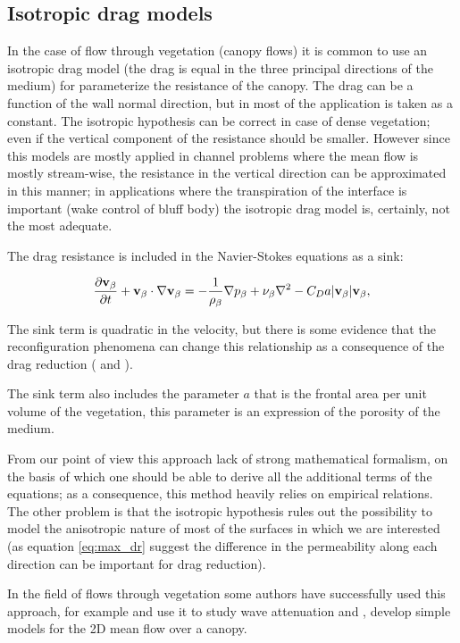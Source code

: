 \subsection{Isotropic drag models}
\label{sec:canopy_eq}

In the case of flow through vegetation (canopy flows) it is common to use an isotropic drag model (the drag is equal in the three principal directions of the medium) for parameterize the resistance of the canopy.
The drag can be a function of the wall normal direction, but in most of the application is taken as a constant.
The isotropic hypothesis can be correct in case of dense vegetation; even if the vertical component of the resistance should be smaller.
However since this models are mostly applied in channel problems where the mean flow is mostly stream-wise, the resistance in the vertical direction can be approximated in this manner; in applications where the transpiration of the interface is important (wake control of bluff body) the isotropic drag model is, certainly, not the most adequate.

The drag resistance is included in the Navier-Stokes equations as a sink:

\begin{equation}
\frac{\partial \textbf{v}_{\beta}}{\partial t} + \textbf{v}_{\beta} \cdot \nabla \textbf{v}_{\beta} = -\frac{1}{\rho_{\beta}} \nabla p_{\beta} + \nu_{\beta} \nabla^2 -C_D a |\textbf{v}_{\beta}| \textbf{v}_{\beta}, 
\label{eq:mom_cd}
\end{equation}

The sink term is quadratic in the velocity, but there is some evidence that the reconfiguration phenomena can change this relationship as a consequence of the drag reduction (\citet{gosselin2011drag} and \citet{alvarado2017nature}).

The sink term also includes the parameter $a$ that is the frontal area per unit volume of the vegetation, this parameter is an expression of the porosity of the medium.

From our point of view this approach lack of strong mathematical formalism, on the basis of which one should be able to derive all the additional terms of the equations; as a consequence, this method heavily relies on empirical relations.
The other problem is that the isotropic hypothesis rules out the possibility to model the anisotropic nature of most of the surfaces in which we are interested (as equation \eqref{eq:max_dr} suggest the difference in the permeability along each direction can be important for drag reduction).

In the field of flows through vegetation some authors have successfully used this approach, for example \citet{maza2013coupled} and \citet{maza2015tsunami} use it to study wave attenuation and \citet{ghisalberti2004limited}, \citet{battiato2014single} develop simple models for the 2D mean flow over a canopy.


